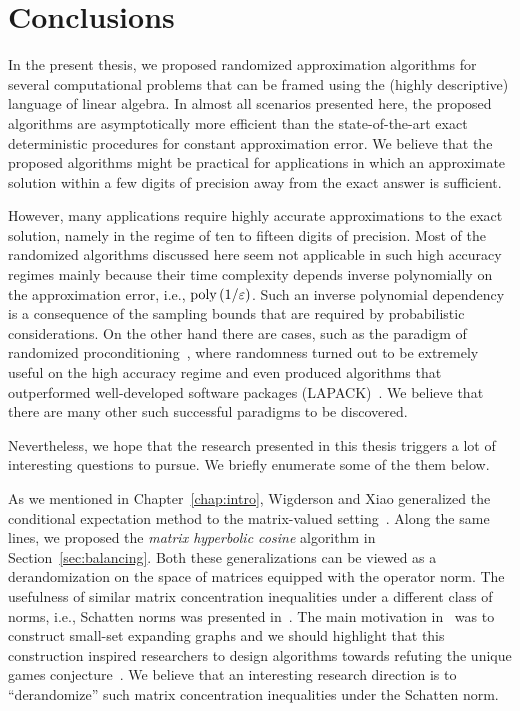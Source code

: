 \chapter{Conclusions}\label{chap:conclusion}
%
In the present thesis, we proposed randomized approximation algorithms for several computational problems that can be framed using the (highly descriptive) language of linear algebra. In almost all scenarios presented here, the proposed algorithms are asymptotically more efficient than the state-of-the-art exact deterministic procedures for constant approximation error. We believe that the proposed algorithms might be practical for applications in which an approximate solution within a few digits of precision away from the exact answer is sufficient.
%

%
However, many applications require highly accurate approximations to the exact solution, namely in the regime of ten to fifteen digits of precision. Most of the randomized algorithms discussed here seem not applicable in such high accuracy regimes mainly because their time complexity depends inverse polynomially on the approximation error, i.e., $\mathrm{poly}\left(1/\varepsilon\right)$. Such an inverse polynomial dependency is a consequence of the sampling bounds that are required by probabilistic considerations. On the other hand there are cases, such as the paradigm of randomized proconditioning~\cite{RT08,AMT10}, where randomness turned out to be extremely useful on the high accuracy regime and even produced algorithms that outperformed well-developed software packages (LAPACK)~\cite{LAPACK}. We believe that there are many other such successful paradigms to be discovered.
%

%
Nevertheless, we hope that the research presented in this thesis triggers a lot of interesting questions to pursue. We briefly enumerate some of the them below.
%

%
As we mentioned in Chapter~\ref{chap:intro}, Wigderson and Xiao generalized the conditional expectation method to the matrix-valued setting~\cite{chernoff:matrix_valued:derand:WX08}. Along the same lines, we proposed the \emph{matrix hyperbolic cosine} algorithm in Section~\ref{sec:balancing}. Both these generalizations can be viewed as a derandomization on the space of matrices equipped with the operator norm. The usefulness of similar matrix concentration inequalities under a different class of norms, i.e., Schatten norms was presented in~\cite{chernoff:matrix_valued:Azuma_Naor}. The main motivation in~\cite{chernoff:matrix_valued:Azuma_Naor} was to construct small-set expanding graphs and we should highlight that this construction inspired researchers to design algorithms towards refuting the unique games conjecture~\cite{ABS10}. We believe that an interesting research direction is to ``derandomize'' such matrix concentration inequalities under the Schatten norm.
%

